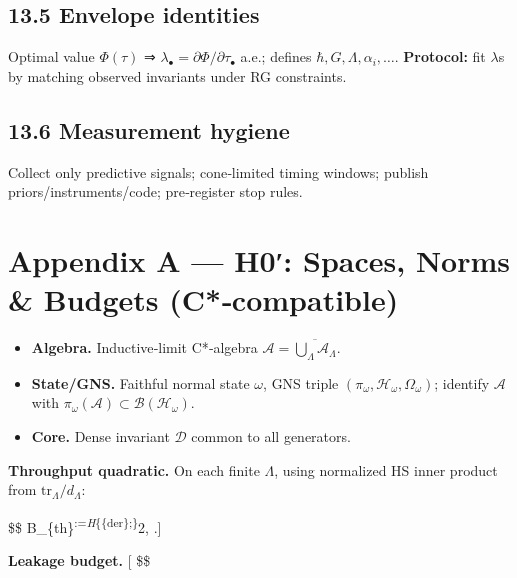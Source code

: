 \documentclass[
]{article}
\providecommand{\tightlist}{%
  \setlength{\itemsep}{0pt}\setlength{\parskip}{0pt}}
\numberwithin{equation}{section}
\begin{document}
\hypertarget{envelope-identities}{%
\subsection{13.5 Envelope identities}\label{envelope-identities}}

Optimal value \(\Phi(\tau)\) ⇒
\(\lambda_\bullet=\partial\Phi/\partial\tau_\bullet\) a.e.; defines
\(\hbar,G,\Lambda,\alpha_i,\ldots\). \textbf{Protocol:} fit \(\lambda\)s
by matching observed invariants under RG constraints.

\hypertarget{measurement-hygiene}{%
\subsection{13.6 Measurement hygiene}\label{measurement-hygiene}}

Collect only predictive signals; cone‑limited timing windows; publish
priors/instruments/code; pre‑register stop rules.

\hypertarget{appendix-a-h0-spaces-norms-budgets-ccompatible}{%
\section{Appendix A --- H0′: Spaces, Norms \& Budgets
(C*‑compatible)}\label{appendix-a-h0-spaces-norms-budgets-ccompatible}}

\begin{itemize}
\tightlist
\item
  \textbf{Algebra.} Inductive‑limit C*‑algebra
  \(\mathcal A=\overline{\bigcup_\Lambda \mathcal A_\Lambda}\).
\item
  \textbf{State/GNS.} Faithful normal state \(\omega\), GNS triple
  \((\pi_\omega,\mathcal H_\omega,\Omega_\omega)\); identify
  \(\mathcal A\) with
  \(\pi_\omega(\mathcal A)\subset\mathcal B(\mathcal H_\omega)\).
\item
  \textbf{Core.} Dense invariant \(\mathcal D\) common to all
  generators.
\end{itemize}

\textbf{Throughput quadratic.} On each finite \(\Lambda\), using
normalized HS inner product from \(\mathrm{tr}_\Lambda/d_\Lambda\):

\$\$
\mathcal B\_\{\rm th\}\textsuperscript{\Lambda:=\textbar{}\delta\emph{H\textbar{}}\{\{\rm der\};\Lambda\}}2,\quad
{}.{]}

\textbf{Leakage budget.} {[}  \$\$
\end{document}
